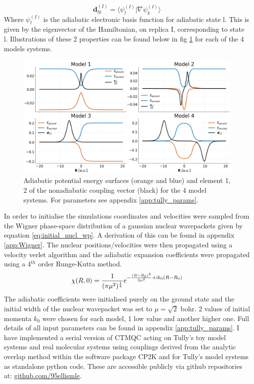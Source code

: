 \begin{equation}
  \mathbf{d}_{lk}^{(I)} = \langle \psi_{l}^{(I)} | \nabla \psi_k^{(I)} \rangle
  \label{eq:NACV_def}
\end{equation}
Where $\psi_{l}^{(I)}$ is the adiabatic electronic basis function for adiabatic state l. This is given by the eigenvector of the Hamiltonian, on replica I, corresponding to state l. Illustrations of these 2 properties can be found below in fig \ref{fig:tully_schematics} for each of the 4 models systems.
\begin{figure}[H]
  \includegraphics[width=\textwidth]{Chapter_tullyModels/model_schematics.png}
  \caption{\label{fig:tully_schematics}Adiabatic potential energy surfaces (orange and blue) and element 1, 2 of the nonadiabatic coupling vector (black) for the 4 model systems. For parameters see appendix \ref{app:tully_params}.}
\end{figure}
\newpage
\noindent In order to initialise the simulations coordinates and velocities were sampled from the Wigner phase-space distribution of a gaussian nuclear wavepackets given by equation \eqref{eq:initial_nucl_wp}. A derivation of this can be found in appendix \ref{app:Wigner}. The nuclear positions/velocities were then propagated using a velocity verlet algorithm and the adiabatic expansion coefficients were propagated using a 4$^{th}$ order Runge-Kutta method.
\begin{equation}
  \chi(R, 0) = \frac{1}{(\pi \mu^2)^{\frac{1}{4}}} e^{-\frac{(R - R_0)^2}{2 \mu^2} + \mathrm{i} k_0 (R - R_0) }
  \label{eq:initial_nucl_wp}
\end{equation}
The adiabatic coefficients were initialised purely on the ground state and the initial width of the nuclear wavepacket was set to $\mu = \sqrt{2}$ bohr. 2 values of initial momenta $k_0$ were chosen for each model, 1 low value and another higher one. Full details of all input parameters can be found in appendix \ref{app:tully_params}. I have implemented a serial version of CTMQC acting on Tully's toy model systems and real molecular systems using couplings derived from the analytic overlap method \cite{gajdos_ultrafast_2014} within the software package CP2K \cite{cp2k} and for Tully's model systems as standalone python code. These are accessible publicly via github repositories at: \href{https://github.com/95ellismle}{github.com/95ellismle}.

